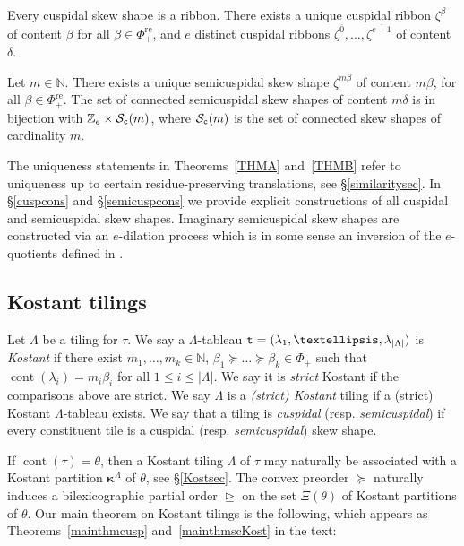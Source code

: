 \documentclass[Unicode,ALCO]{cedram}
\newcommand{\SSSS}{\mathcal{S}}
\newcommand{\0}{{\bar 0}}
\newcommand{\ttt}{{\tt t}}
\newcommand{\ZZ}{{\mathbb Z}}
\newcommand{\NN}{{\mathbb N}}
\newcommand{\bkap}{\boldsymbol{\kappa}}
\def\cont{{\operatorname{cont}}}
\def\re{{\mathrm{re}}}
\begin{document}
\begin{introtheorem}\label{THMA}
Every cuspidal skew shape is a ribbon.
There exists a unique cuspidal ribbon \(\zeta^\beta\) of content \(\beta\) for all \(\beta \in \Phi_+^\re\), and \(e\) distinct cuspidal ribbons \(\zeta^{\overline{0}}, \ldots, \zeta^{\overline{e-1}}\) of content \(\delta\). 
\end{introtheorem}

\begin{introtheorem}\label{THMB}
Let \(m \in \NN\).
There exists a unique semicuspidal skew shape \(\zeta^{m \beta}\) of content \(m \beta\), for all \(\beta \in \Phi_+^\re\). The set of connected semicuspidal skew shapes of content \(m \delta\) is in bijection with \(\ZZ_e \times \SSSS_{\tt c}(m)\), where \(\SSSS_{\tt c}(m)\) is the set of connected skew shapes of cardinality \(m\). 
\end{introtheorem}

The uniqueness statements in Theorems~\ref{THMA} and~\ref{THMB} refer to uniqueness up to certain residue-preserving translations, see \S\ref{similaritysec}. In \S\ref{cuspcons} and \S\ref{semicuspcons} we provide explicit constructions of all cuspidal and semicuspidal skew shapes. Imaginary semicuspidal skew shapes are constructed via an \(e\)-dilation process which is in some sense an inversion of the \(e\)-quotients defined in \cite{LittlewoodModRep}.

\subsection{Kostant tilings}\label{Kosint}
Let \(\Lambda\) be a tiling for \(\tau\). We say a \(\Lambda\)-tableau \(\ttt = (\lambda_1, \ldots, \lambda_{|\Lambda|})\) is {\em Kostant} if there exist \(m_1, \ldots, m_k \in \NN\), \(\beta_1\succeq \ldots \succeq \beta_k \in \Phi_+\) such that \(\cont(\lambda_i) = m_i \beta_i\) for all \(1 \leq i \leq |\Lambda|\). We say it is {\em strict} Kostant if the comparisons above are strict. We say \(\Lambda\) is a {\em (strict) Kostant} tiling if a (strict) Kostant \(\Lambda\)-tableau exists. We say that a tiling is {\em cuspidal} (resp. {\em semicuspidal}) if every constituent tile is a cuspidal (resp. {\em semicuspidal}) skew shape. 

If \(\cont(\tau) = \theta\), then a Kostant tiling \(\Lambda\) of \(\tau\) may naturally be associated with a Kostant partition \(\bkap^\Lambda\) of \(\theta\), see \S\ref{Kostsec}. The convex preorder \(\succeq\) naturally induces a bilexicographic partial order \(\trianglerighteq\) on the set \(\Xi(\theta)\) of Kostant partitions of \(\theta\). Our main theorem on Kostant tilings is the following, which appears as Theorems~\ref{mainthmcusp} and~\ref{mainthmscKost} in the text:
\end{document}
